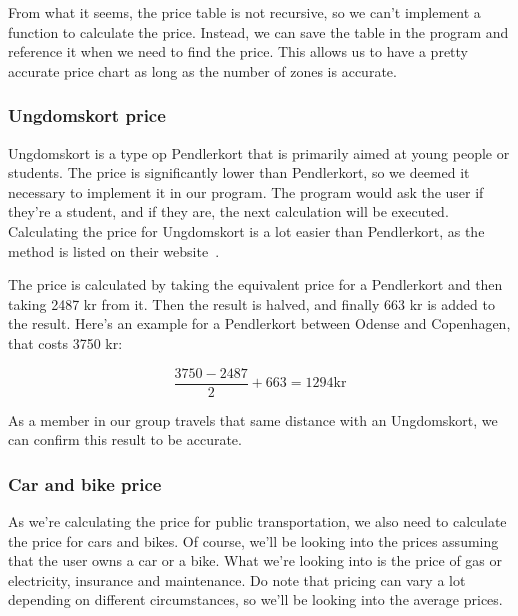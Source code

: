 From what it seems, the price table is not recursive, so we can't implement a function to calculate the price.
Instead, we can save the table in the program and reference it when we need to find the price.
This allows us to have a pretty accurate price chart as long as the number of zones is accurate.

\subsubsection{Ungdomskort price}

Ungdomskort is a type op Pendlerkort that is primarily aimed at young people or students.
The price is significantly lower than Pendlerkort, so we deemed it necessary to implement it in our program.
The program would ask the user if they're a student, and if they are, the next calculation will be executed.
Calculating the price for Ungdomskort is a lot easier than Pendlerkort, as the method is listed on their
website~\cite{price_ung}.

The price is calculated by taking the equivalent price for a Pendlerkort and then taking 2487 kr from it.
Then the result is halved, and finally 663 kr is added to the result.
Here's an example for a Pendlerkort between Odense and Copenhagen, that costs 3750 kr:

\begin{equation}
    \frac{3750 - 2487}{2} + 663 = 1294 \text{kr}
\end{equation}

As a member in our group travels that same distance with an Ungdomskort, we can confirm this result to be accurate.

\subsubsection{Car and bike price}

As we're calculating the price for public transportation, we also need to calculate the price for cars and bikes.
Of course, we'll be looking into the prices assuming that the user owns a car or a bike.
What we're looking into is the price of gas or electricity, insurance and maintenance.
Do note that pricing can vary a lot depending on different circumstances, so we'll be looking into the average prices.

